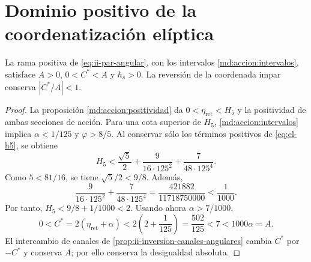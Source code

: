 \section{Dominio positivo de la coordenatización elíptica}
\begin{proposition}
\label{iv:ellipse:pertenencia}
La rama positiva de \eqref{eq:ii-par-angular}, con los
intervalos \eqref{md:accion:intervalos}, satisface
\(A>0\), \(0<C^*<A\) y \(\hbar_s>0\).
La reversión de la coordenada impar conserva \(|C^*/A|<1\).
\end{proposition}
\begin{proof}
La proposición \ref{md:accion:positividad} da
\(0<\eta_{\mathrm{ret}}<H_5\) y la positividad de ambas
secciones de acción. Para una cota superior de \(H_5\),
\eqref{md:accion:intervalos} implica
\(\alpha<1/125\) y \(\varphi>8/5\). Al conservar sólo
los términos positivos de \eqref{eq:el-h5}, se obtiene
\[
 H_5<
 \frac{\sqrt5}{2}+
 \frac{9}{16\cdot125^2}+
 \frac{7}{48\cdot125^4}.
\]
Como \(5<81/16\), se tiene \(\sqrt5/2<9/8\). Además,
\[
 \frac{9}{16\cdot125^2}+
 \frac{7}{48\cdot125^4}
 =\frac{421882}{11718750000}<\frac1{1000}.
\]
Por tanto, \(H_5<9/8+1/1000<2\). Usando ahora
\(\alpha>7/1000\),
\[
 0<C^*=2(\eta_{\mathrm{ret}}+\alpha)
 <2\left(2+\frac1{125}\right)=\frac{502}{125}
 <7<1000\alpha=A.
\]
El intercambio de canales de
\ref{prop:ii-inversion-canales-angulares} cambia \(C^*\) por \(-C^*\)
y conserva \(A\); por ello conserva la desigualdad absoluta.
\end{proof}
